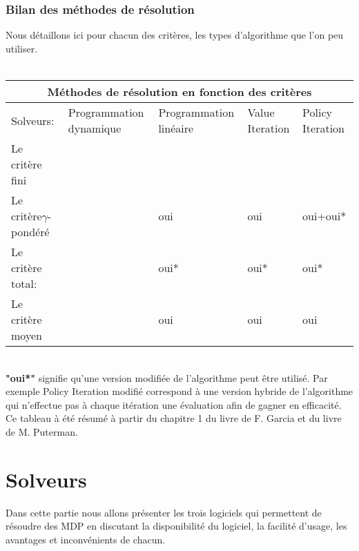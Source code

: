 \documentclass{article}
\begin{document}
\subsubsection{Bilan des méthodes de résolution}
Nous détaillons ici pour chacun des critères, les types d'algorithme que l'on peu utiliser.\\\\
\begin{tabular}{ |p{3cm}||p{2.5cm}|p{2.5cm}|p{2.5cm}|p{2.5cm}|  }
 \hline
 \multicolumn{5}{|c|}{Méthodes de résolution en fonction des critères} \\
 \hline
   Solveurs: & Programmation dynamique & Programmation linéaire & Value Iteration & Policy Iteration\\
 \hline
 Le critère fini   & & & & \\
 Le critère$\gamma$-pondéré & & oui & oui & oui+oui* \\
 Le critère total: & & oui* & oui* & oui*\\
 Le critère moyen & & oui & oui & oui\\
 \hline
\end{tabular}\\

\noindent \textbf{"oui*"} signifie qu'une version modifiée de l'algorithme peut être utilisé. Par exemple Policy Iteration modifié correspond à une version hybride de l'algorithme qui n'effectue pas à chaque itération une évaluation afin de gagner en efficacité. Ce tableau à été résumé à partir du chapitre 1 du livre de F. Garcia et du livre de M. Puterman.


\section{Solveurs}
Dans cette partie nous allons présenter les trois logiciels qui permettent de résoudre des MDP en discutant la disponibilité du logiciel, la facilité d'usage, les avantages et inconvénients de chacun.
\end{document}
